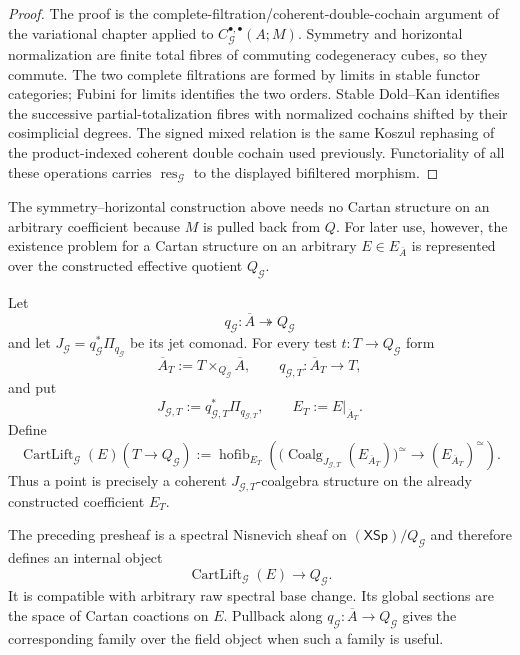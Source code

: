 \begin{proof}
The proof is the complete-filtration/coherent-double-cochain argument of the
variational chapter applied to
$C_{\mathcal G}^{\bullet,\bullet}(A;M)$.  Symmetry and horizontal normalization are
finite total fibres of commuting codegeneracy cubes, so they commute.  The two
complete filtrations are formed by limits in stable functor categories; Fubini for
limits identifies the two orders.  Stable Dold--Kan identifies the successive
partial-totalization fibres with normalized cochains shifted by their
cosimplicial degrees.  The signed mixed relation is the same Koszul rephasing of
the product-indexed coherent double cochain used previously.  Functoriality of all
these operations carries $\operatorname{res}_{\mathcal G}$ to the displayed
bifiltered morphism.
\end{proof}

\begin{construction}
\label{constr:symmetry-noether-cartan-lift-realization-for-an-arbitrary-coefficient}
The symmetry--horizontal construction above needs no Cartan structure on an arbitrary
coefficient because $M$ is pulled back from $Q$.  For later use, however, the
existence problem for a Cartan structure on an arbitrary
$E\in E_{\overline A}$ is represented over the constructed effective quotient
$Q_{\mathcal G}$.

Let
\[
q_{\mathcal G}:\overline A\twoheadrightarrow Q_{\mathcal G}
\]
and let $J_{\mathcal G}=q_{\mathcal G}^*\Pi_{q_{\mathcal G}}$ be its jet
comonad.  For every test $t:T\to Q_{\mathcal G}$ form
\[
\overline A_T:=T\times_{Q_{\mathcal G}}\overline A,
\qquad
q_{\mathcal G,T}:\overline A_T\longrightarrow T,
\]
and put
\[
J_{\mathcal G,T}:=q_{\mathcal G,T}^*\Pi_{q_{\mathcal G,T}},
\qquad
E_T:=E|_{\overline A_T}.
\]
Define
\[
\boxed{
\operatorname{CartLift}_{\mathcal G}(E)(T\to Q_{\mathcal G})
:=
\operatorname{hofib}_{E_T}
\left(
\bigl(\operatorname{Coalg}_{J_{\mathcal G,T}}
(E_{\overline A_T})\bigr)^\simeq
\longrightarrow
(E_{\overline A_T})^\simeq
\right).
}
\]
Thus a point is precisely a coherent $J_{\mathcal G,T}$-coalgebra structure on
the already constructed coefficient $E_T$.
\end{construction}

\begin{proposition}
\label{prop:symmetry-noether-descent-and-base-change-of-the-cartan-lift-realization}
The preceding presheaf is a spectral Nisnevich sheaf on
$(\mathsf{XSp})/Q_{\mathcal G}$ and therefore defines an internal object
\[
\boxed{
\operatorname{CartLift}_{\mathcal G}(E)
\longrightarrow Q_{\mathcal G}.
}
\]
It is compatible with arbitrary raw spectral base change.  Its global sections
are the space of Cartan coactions on $E$.  Pullback along
$q_{\mathcal G}:\overline A\to Q_{\mathcal G}$ gives the corresponding family
over the field object when such a family is useful.
\end{proposition}

